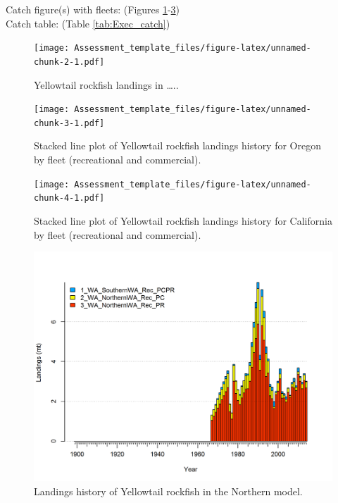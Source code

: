 \documentclass[12pt,]{article}
\begin{document}
Catch figure(s) with fleets: (Figures
\ref{fig:Exec_catch1}-\ref{fig:Exec_catch3})\\
Catch table: (Table \ref{tab:Exec_catch})

\FloatBarrier

\begin{figure}[htbp]
\centering
\texttt{[image: Assessment\_template\_files/figure-latex/unnamed-chunk-2-1.pdf]}
\caption{Yellowtail rockfish landings in \ldots{}..
\label{fig:Exec_catch1}}
\end{figure}

\begin{figure}[htbp]
\centering
\texttt{[image: Assessment\_template\_files/figure-latex/unnamed-chunk-3-1.pdf]}
\caption{Stacked line plot of Yellowtail rockfish landings history for
Oregon by fleet (recreational and commercial). \label{fig:Exec_catch2}}
\end{figure}

\begin{figure}[htbp]
\centering
\texttt{[image: Assessment\_template\_files/figure-latex/unnamed-chunk-4-1.pdf]}
\caption{Stacked line plot of Yellowtail rockfish landings history for
California by fleet (recreational and commercial).
\label{fig:Exec_catch3}}
\end{figure}

\FloatBarrier

\begin{figure}[htbp]
\centering
\includegraphics{r4ss/plots_mod1/catch2 landings stacked.png}
\caption{Landings history of Yellowtail rockfish in the Northern model.
\label{fig:r4ss_catches}}
\end{figure}
\end{document}
